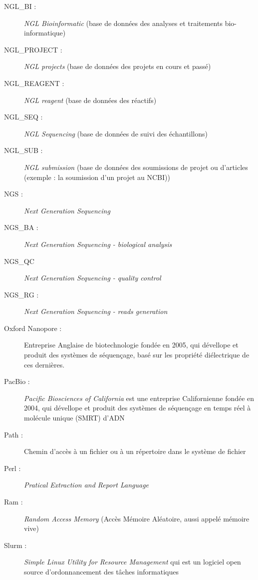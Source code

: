 \begin{description}
    \item[NGL\_BI :] \emph{NGL Bioinformatic} (base de données des analyses et traitements bio-informatique)
    \item[NGL\_PROJECT :] \emph{NGL projects} (base de données des projets en cours et passé)
    \item[NGL\_REAGENT :] \emph{NGL reagent} (base de données des réactifs)
    \item[NGL\_SEQ :] \emph{NGL Sequencing} (base de données de suivi des échantillons)
    \item[NGL\_SUB :] \emph{NGL submission} (base de données des soumissions de projet ou d'articles (exemple : la soumission d'un projet au NCBI))
    \item[NGS :] \emph{Next Generation Sequencing}
    \item[NGS\_BA :] \emph{Next Generation Sequencing - biological analysis}
    \item[NGS\_QC] \emph{Next Generation Sequencing - quality control}
    \item[NGS\_RG : ] \emph{Next Generation Sequencing - reads generation}
    \item[Oxford Nanopore :] Entreprise Anglaise de biotechnologie fondée en 2005, qui dévellope et produit des systèmes de séquençage, basé sur les propriété diélectrique de ces dernières.
    \item[PacBio :] \emph{Pacific Biosciences of California} est une entreprise Californienne fondée en 2004, qui dévellope et produit des systèmes de séquençage en temps réel à molécule unique (SMRT) d'ADN
    \item[Path : ] Chemin d'accès à un fichier ou à un répertoire dans le système de fichier
    \item[Perl :] \emph{Pratical Extraction and Report Language}
    \item[Ram :] \emph{Random Access Memory} (Accès Mémoire Aléatoire, aussi appelé mémoire vive)
    \item[Slurm :] \emph{Simple Linux Utility for Resource Management} qui est un logiciel open source d'ordonnancement des tâches informatiques
\end{description}